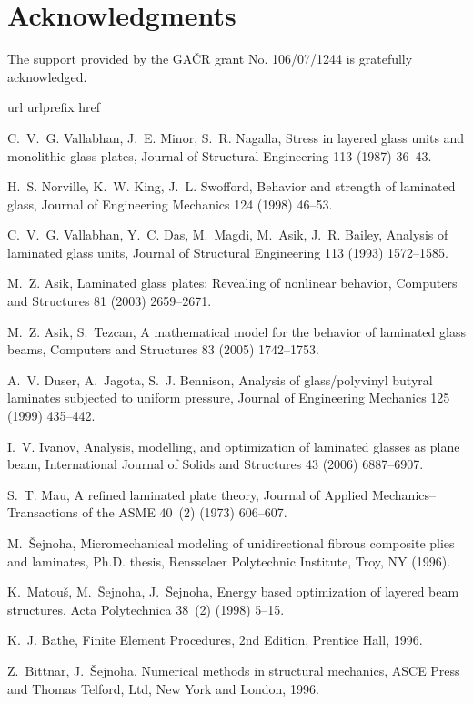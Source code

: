 \documentclass[times,a4paper,12pt]{elsarticle}
\begin{document}
\section*{Acknowledgments}
The support provided by the GA\v CR grant No. 106/07/1244 is gratefully acknowledged.

 


\begin{thebibliography}{10}
\expandafter\ifx\csname url\endcsname\relax
  \def\url#1{\texttt{#1}}\fi
\expandafter\ifx\csname urlprefix\endcsname\relax\def\urlprefix{URL }\fi
\expandafter\ifx\csname href\endcsname\relax
  \def\href#1#2{#2} \def\path#1{#1}\fi

C.~V.~G. Vallabhan, J.~E. Minor, S.~R. Nagalla, Stress in layered glass units
  and monolithic glass plates, Journal of Structural Engineering 113 (1987)
  36--43.

H.~S. Norville, K.~W. King, J.~L. Swofford, Behavior and strength of laminated
  glass, Journal of Engineering Mechanics 124 (1998) 46--53.

C.~V.~G. Vallabhan, Y.~C. Das, M.~Magdi, M.~Asik, J.~R. Bailey, Analysis of
  laminated glass units, Journal of Structural Engineering 113 (1993)
  1572--1585.

M.~Z. Asik, Laminated glass plates: Revealing of nonlinear behavior, Computers
  and Structures 81 (2003) 2659--2671.

M.~Z. Asik, S.~Tezcan, A mathematical model for the behavior of laminated glass
  beams, Computers and Structures 83 (2005) 1742--1753.

A.~V. Duser, A.~Jagota, S.~J. Bennison, Analysis of glass/polyvinyl butyral
  laminates subjected to uniform pressure, Journal of Engineering Mechanics 125
  (1999) 435--442.

I.~V. Ivanov, Analysis, modelling, and optimization of laminated glasses as
  plane beam, International Journal of Solids and Structures 43 (2006)
  6887--6907.

S.~T. Mau, A refined laminated plate theory, Journal of Applied
  Mechanics--Transactions of the ASME 40~(2) (1973) 606--607.

M.~\v{S}ejnoha, Micromechanical modeling of unidirectional fibrous composite
  plies and laminates, Ph.D. thesis, Rensselaer Polytechnic Institute, Troy, NY
  (1996).

K.~Matou\v{s}, M.~\v{S}ejnoha, J.~\v{S}ejnoha, Energy based optimization of
  layered beam structures, Acta Polytechnica 38~(2) (1998) 5--15.

K.~J. Bathe, Finite Element Procedures, 2nd Edition, Prentice Hall, 1996.

Z.~Bittnar, J.~\v{S}ejnoha, Numerical methods in structural mechanics, ASCE
  Press and Thomas Telford, Ltd, New York and London, 1996.

\end{thebibliography}
\end{document}
